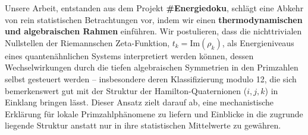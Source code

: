 \documentclass[11pt,a4paper]{article}
\theoremstyle{definition}
\begin{document}
Unsere Arbeit, entstanden aus dem Projekt \textbf{\#Energiedoku}, schlägt eine Abkehr von rein statistischen Betrachtungen vor, indem wir einen \textbf{thermodynamischen und algebraischen Rahmen} einführen. Wir postulieren, dass die nichttrivialen Nullstellen der Riemannschen Zeta-Funktion, $t_k = \text{Im}(\rho_k)$, als Energieniveaus eines quantenähnlichen Systems interpretiert werden können, dessen Wechselwirkungen durch die tiefen algebraischen Symmetrien in den Primzahlen selbst gesteuert werden -- insbesondere deren Klassifizierung modulo 12, die sich bemerkenswert gut mit der Struktur der Hamilton-Quaternionen ($i, j, k$) in Einklang bringen lässt. Dieser Ansatz zielt darauf ab, eine mechanistische Erklärung für lokale Primzahlphänomene zu liefern und Einblicke in die zugrunde liegende Struktur anstatt nur in ihre statistischen Mittelwerte zu gewähren.
\end{document}
